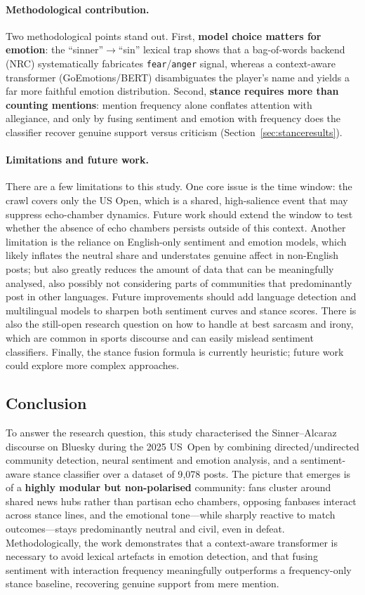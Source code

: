 \documentclass[12pt,a4paper]{article}
\begin{document}
\paragraph{Methodological contribution.}
Two methodological points stand out. First, \textbf{model choice matters for emotion}: the
``sinner''$\to$``sin'' lexical trap shows that a bag-of-words backend (NRC) systematically
fabricates \texttt{fear}/\texttt{anger} signal, whereas a context-aware transformer
(GoEmotions/BERT) disambiguates the player's name and yields a far more faithful emotion
distribution. Second, \textbf{stance requires more than counting mentions}: mention frequency
alone conflates attention with allegiance, and only by fusing sentiment and emotion with
frequency does the classifier recover genuine support versus criticism
(Section~\ref{sec:stanceresults}).

\paragraph{Limitations and future work.}
There are a few limitations to this study. One core issue is the time window: the crawl covers only 
the US Open, which is a shared, high-salience event that may suppress echo-chamber dynamics.
Future work should extend the window to test whether the absence of echo chambers persists outside 
of this context. Another limitation is the reliance on English-only sentiment and emotion models,
which likely inflates the neutral share and understates genuine affect in non-English posts; but also 
greatly reduces the amount of data that can be meaningfully analysed, also possibly not considering 
parts of communities that predominantly post in other languages. 
Future improvements should add language detection and multilingual models to sharpen both sentiment
curves and stance scores. There is also the still-open research question on how to handle at best
sarcasm and irony, which are common in sports discourse and can easily mislead sentiment classifiers. 
Finally, the stance fusion formula is currently heuristic; future work could explore more complex 
approaches.

\subsection{Conclusion}

To answer the research question, this study characterised the Sinner--Alcaraz discourse on Bluesky 
during the 2025 US~Open by combining directed/undirected community detection, neural sentiment
and emotion analysis, and a sentiment-aware stance classifier over a dataset of 9{,}078 posts. 
The picture that emerges is of a \textbf{highly modular but non-polarised} community: fans cluster 
around shared news hubs rather than partisan echo chambers, opposing fanbases interact across stance
lines, and the emotional tone---while sharply reactive to match outcomes---stays predominantly neutral
and civil, even in defeat. Methodologically, the work demonstrates that a context-aware transformer
is necessary to avoid lexical artefacts in emotion detection, and that fusing sentiment with
interaction frequency meaningfully outperforms a frequency-only stance baseline, recovering genuine
support from mere mention.
\end{document}

